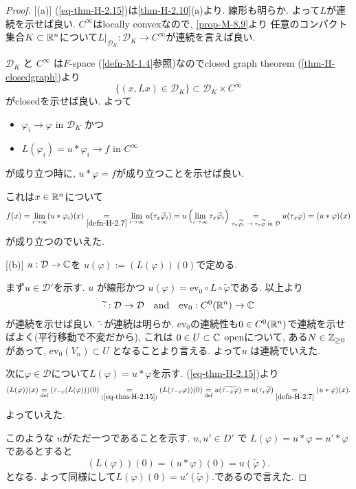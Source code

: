 \begin{proof}

[(a)]
(\ref{eq-thm-H-2.15})は\ref{thm-H-2.10}(a)より. 
線形も明らか.  よって\(L\)が連続を示せば良い.
$C^\infty$はlocally convexなので, \ref{prop-M-8.9}より
任意のコンパクト集合$K \subset \mathbb{R}^n$について$L|_{\mathcal{D}_{K} } : \mathcal{D}_{K} \to C^\infty$が連続を言えば良い.

\(\mathcal{D}_{K}\) と \(C^\infty\) は\(F\)-space (\ref{defn-M-1.4}参照)なのでclosed graph theorem (\ref{thm-H-closedgraph})より
$$
\{ (x, L x) \in \mathcal{D}_{K}\} \subset \mathcal{D}_{K} \times C^\infty
$$
がclosedを示せば良い. 
よって
\begin{itemize}
\item \(\varphi_i \to \varphi\) in \(\mathcal{D}_{K}\) かつ
\item \(L(\varphi_i) = u \ast  \varphi_i \to f  \) in  \(C^\infty\)
\end{itemize}
が成り立つ時に,  \(u \ast \varphi = f\)が成り立つことを示せば良い. 

これは$x \in \mathbb{R}^n$について
\[
f(x) 
= \lim_{i \to \infty} (u \ast \varphi_i)(x)
\underset{\ref{defn-H-2.7}}{=} \lim_{i \to \infty} u(\tau_x \widetilde{\varphi_i})
= u \left( \lim_{i \to \infty} \tau_x \widetilde{\varphi_i} \right)
\underset{\text{$\tau_x \widetilde{\varphi_i} \to \tau_x \widetilde{\varphi}$ in $\mathcal{D}$}}{=} u(\tau_x \varphi) 
= (u \ast \varphi)(x) 
\]
が成り立つのでいえた.

[(b)]
 \(u :\mathcal{D} \to \mathbb{C}\)を \(u(\varphi) := (L(\varphi))(0)\)で定める. 

まず\(u \in \mathcal{D}'\)を示す. 
\(u\) が線形かつ
\(u(\varphi) = \mathrm{ev}_0 \circ L \circ \widetilde{\varphi}\)である.
以上より
\[
\widetilde{\cdot} :\mathcal{D} \to \mathcal{D}
\quad
\text{and}
\quad
\mathrm{ev}_0: C^0(\mathbb{R}^n) \to \mathbb{C}
\]
が連続を示せば良い. 
 \(\widetilde{\cdot}\)が連続は明らか.
 $\mathrm{ev}_0$の連続性も$0 \in C^0(\mathbb{R}^n)$で連続を示せばよく(平行移動で不変だから), これは
  \(0 \in U \subset \mathbb{C}\) openについて, ある\(N \in \mathbb{Z}_{\ge 0}\) があって, 
  \(\mathrm{ev}_0(V_n) \subset U\) となることより言える. 
  よって\(u\) は連続でいえた.

次に\( \varphi \in \mathcal{D}\)について\(L(\varphi) = u \ast \varphi\)を示す.
(\ref{eq-thm-H-2.15})より
\begin{equation}
\label{eq2-thm-H-2.15}
(L(\varphi))(x) 
\underset{\text{def}}{=} (\tau_{-x}(L(\varphi)))(0)
\underset{(\ref{eq-thm-H-2.15})}{=}  (L(\tau_{-x} \varphi))(0) 
\underset{\text{def}}{=}  u(\widetilde{\tau_{-x}\varphi})
= u(\tau_x \widetilde{\varphi}) 
\underset{\ref{defn-H-2.7}}{=}  (u \ast \varphi)(x).
\end{equation}
よっていえた.

このような \(u\)がただ一つであることを示す.
\(u, u' \in D'\) で \(L(\varphi) = u \ast \varphi = u' \ast\varphi\)であるとすると
\[
(L(\varphi))(0) = (u \ast \varphi)(0) = u(\widetilde{\varphi}).
\]
となる. よって同様にして\(L(\varphi)(0) = u'(\widetilde{\varphi}).\)であるので言えた. 
\end{proof}

